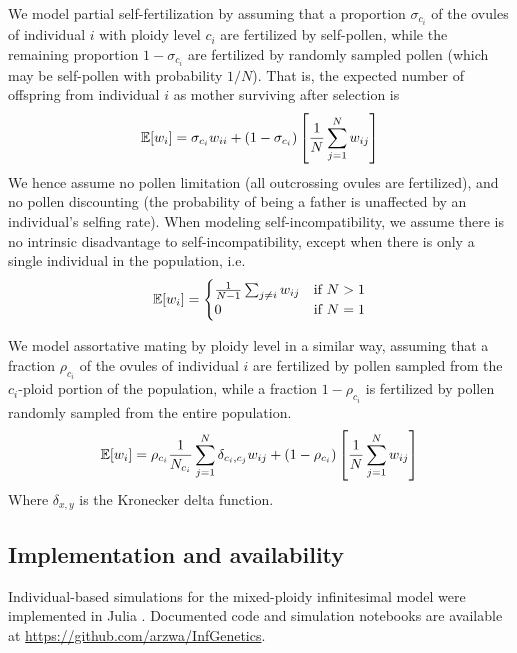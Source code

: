 \documentclass[12pt,a4paper]{article}
\providecommand{\DIFaddbegin}{} %
\providecommand{\DIFaddend}{} %
\providecommand{\DIFdelbegin}{} %
\providecommand{\DIFdelend}{} %
\begin{document}
    We model partial self-fertilization by assuming that a proportion
    $\sigma_{c_i}$ of the ovules of individual $i$ with ploidy level $c_i$ are
    fertilized by self-pollen, while the remaining proportion $1-\sigma_{c_i}$ are
    fertilized by randomly sampled pollen (which may be self-pollen with
    probability $1/N$). 
    That is, the expected number of offspring from individual $i$ as mother
    surviving after selection is
    \begin{equation}
    \mathbb{E}[w_i] = \sigma_{c_i} w_{ii} +
      (1-\sigma_{c_i})\left[\frac{1}{N}\sum_{j=1}^N w_{ij}\right]
    \end{equation}
    We hence assume no pollen limitation (all outcrossing ovules are fertilized),
    and no pollen discounting (the probability of being a father is unaffected by
    an individual's selfing rate).
    When modeling self-incompatibility, we assume there is no intrinsic
    disadvantage to self-incompatibility, except when there is only a single
    individual in the population, i.e.
    \begin{equation}
    \mathbb{E}[w_i] = \begin{cases}
        \frac{1}{N-1}\sum_{j \ne i }w_{ij} & \text{if } N > 1\\ 
        0 & \text{if } N=1 \end{cases}
    \end{equation}

    We model assortative mating by ploidy level in a similar way, assuming that a
    fraction $\rho_{c_i}$ of the ovules of individual $i$ are fertilized by pollen
    sampled from the $c_i$-ploid portion of the population, while a fraction
    $1-\rho_{c_i}$ is fertilized by pollen randomly sampled from the entire
    population.
    \begin{equation}
    \mathbb{E}[w_i] = \rho_{c_i} \frac{1}{N_{c_{i}}} \sum_{j=1}^N \delta_{c_i,c_j}w_{ij}
     + (1-\rho_{c_i})
    \left[\frac{1}{N}\sum_{j=1}^N w_{ij}\right]
    \end{equation}
    Where $\delta_{x,y}$ is the Kronecker delta function.

    \subsection*{Implementation and availability}

    Individual-based simulations for the mixed-ploidy infinitesimal model were
    implemented in Julia \citep{julia}.
    Documented code and simulation notebooks are available at
    \DIFdelbegin %
\DIFdelend \DIFaddbegin \url{https://github.com/arzwa/InfGenetics}\DIFaddend .
\end{document}
